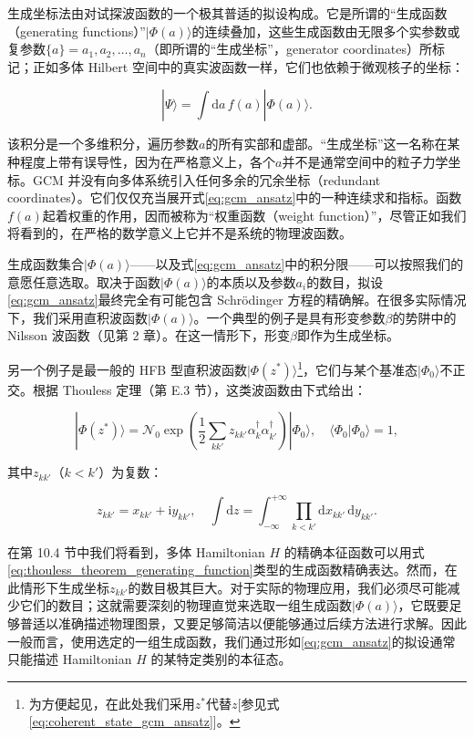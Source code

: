 生成坐标法由对试探波函数的一个极其普适的拟设构成。它是所谓的``生成函数（generating functions）''$|\Phi(a)\rangle$的连续叠加，这些生成函数由无限多个实参数或复参数$\{a\}=a_{1},a_{2},\dots,a_{n}$（即所谓的``生成坐标''，generator
coordinates）所标记；正如多体 Hilbert 空间中的真实波函数一样，它们也依赖于微观核子的坐标：

\begin{equation}
|\Psi\rangle=\int\mathrm{d}a\,f(a)|\Phi(a)\rangle.\label{eq:gcm_ansatz}
\end{equation}

该积分是一个多维积分，遍历参数$a$的所有实部和虚部。``生成坐标''这一名称在某种程度上带有误导性，因为在严格意义上，各个$a$并不是通常空间中的粒子力学坐标。GCM
并没有向多体系统引入任何多余的冗余坐标（redundant coordinates）。它们仅仅充当展开式\ref{eq:gcm_ansatz}中的一种连续求和指标。函数$f(a)$起着权重的作用，因而被称为``权重函数（weight
function）''，尽管正如我们将看到的，在严格的数学意义上它并不是系统的物理波函数。

生成函数集合$|\Phi(a)\rangle$——以及式\ref{eq:gcm_ansatz}中的积分限——可以按照我们的意愿任意选取。取决于函数$|\Phi(a)\rangle$的本质以及参数$a_{i}$的数目，拟设\ref{eq:gcm_ansatz}最终完全有可能包含
Schrödinger 方程的精确解。在很多实际情况下，我们采用直积波函数$|\Phi(a)\rangle$。一个典型的例子是具有形变参数$\beta$的势阱中的
Nilsson 波函数（见第 2 章）。在这一情形下，形变$\beta$即作为生成坐标。

另一个例子是最一般的 HFB 型直积波函数$|\Phi(z^{*})\rangle$\footnote{为方便起见，在此处我们采用$z^{*}$代替$z${[}参见式\ref{eq:coherent_state_gcm_ansatz}{]}。}，它们与某个基准态$|\Phi_{0}\rangle$不正交。根据
Thouless 定理（第 E.3 节），这类波函数由下式给出：

\begin{equation}
|\Phi(z^{*})\rangle=\mathscr{N}_{0}\exp\left(\frac{1}{2}\sum_{kk'}z_{kk'}\alpha^{\dagger}_{k}\alpha^{\dagger}_{k'}\right)|\Phi_{0}\rangle,\quad\langle\Phi_{0}|\Phi_{0}\rangle=1,\label{eq:thouless_theorem_generating_function}
\end{equation}

其中$z_{kk'}$（$k<k'$）为复数：

\begin{equation}
z_{kk'}=x_{kk'}+\mathrm{i}y_{kk'},\quad\int\mathrm{d}z=\int^{+\infty}_{-\infty}\prod_{k<k'}\mathrm{d}x_{kk'}\,\mathrm{d}y_{kk'}.\label{eq:complex_parameter_measure}
\end{equation}

在第 10.4 节中我们将看到，多体 Hamiltonian $H$ 的精确本征函数可以用式\ref{eq:thouless_theorem_generating_function}类型的生成函数精确表达。然而，在此情形下生成坐标$z_{kk'}$的数目极其巨大。对于实际的物理应用，我们必须尽可能减少它们的数目；这就需要深刻的物理直觉来选取一组生成函数$|\Phi(a)\rangle$，它既要足够普适以准确描述物理图景，又要足够简洁以便能够通过后续方法进行求解。因此一般而言，使用选定的一组生成函数，我们通过形如\ref{eq:gcm_ansatz}的拟设通常只能描述
Hamiltonian $H$ 的某特定类别的本征态。

